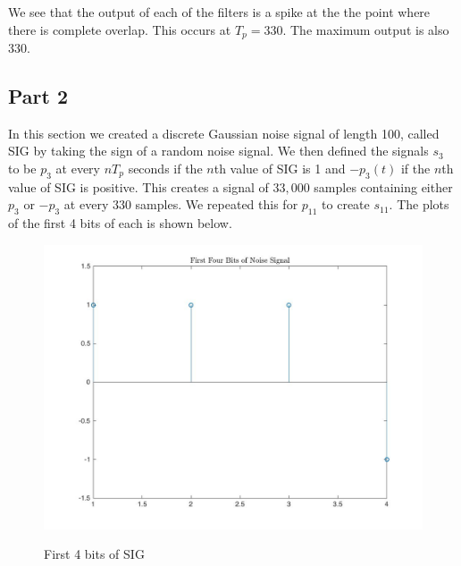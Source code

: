 \documentclass{article}
\begin{document}
\clearpage
We see that the output of each of the filters is a spike at the the point where there is complete overlap. This occurs at $T_p = 330$. The maximum output is also 330. 

\subsection{Part 2}
In this section we created a discrete Gaussian noise signal of length 100, called SIG by taking the sign of a random noise signal. We then defined the signals $s_3$ to be $p_3$ at every $nT_p$ seconds if the $n$th value of SIG is 1 and $-p_3(t)$ if the $n$th value of SIG is positive. This creates a signal of $33,000$ samples containing either $p_3$ or $-p_3$ at every $330$ samples. We repeated this for $p_{11}$ to create $s_{11}$. The plots of the first 4 bits of each is shown below. 


\begin{figure}[!htb]
    \centering
    \begin{minipage}{.5\textwidth}
        \centering
        \includegraphics[width=1.0\linewidth, height=0.2\textheight]{noise.jpg}

        \label{fig:prob1_6_2}
    \end{minipage}
    \caption{First 4 bits of SIG}
\end{figure}
\end{document}
